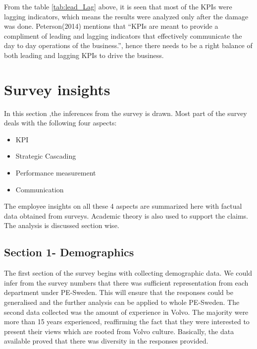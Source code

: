 From the table \ref{tab:lead_Lag} above, it is seen that most of the KPIs were lagging indicators, which means the results were analyzed only after the damage was done. Peterson(2014) mentions that “KPIs are meant to provide a compliment of leading and lagging indicators that effectively communicate the day to day operations of the business.”, hence there needs to be a right balance of both leading and lagging KPIs to drive the business.

\section{ Survey insights }
In this section ,the inferences from the survey is drawn. Most part of the survey deals with the following four aspects: 
\begin{itemize}
    \item KPI
    \item Strategic Cascading
    \item Performance measurement
    \item Communication
\end{itemize}
The employee insights on all these 4 aspects are summarized here with factual data obtained from surveys. Academic theory is also used to support the claims. The analysis is discussed section wise.
\subsection{Section 1- Demographics}
The first section of the survey begins with collecting demographic data. We could infer from the survey numbers that there was sufficient representation from each department under PE-Sweden. This will ensure that the responses could be generalised and the further analysis can be applied to whole PE-Sweden. The second data collected was the amount of experience in Volvo. The majority were more than 15 years experienced, reaffirming the fact that they were interested to present their views which are rooted from Volvo culture. Basically, the data available proved that there was diversity in the responses provided.\\

